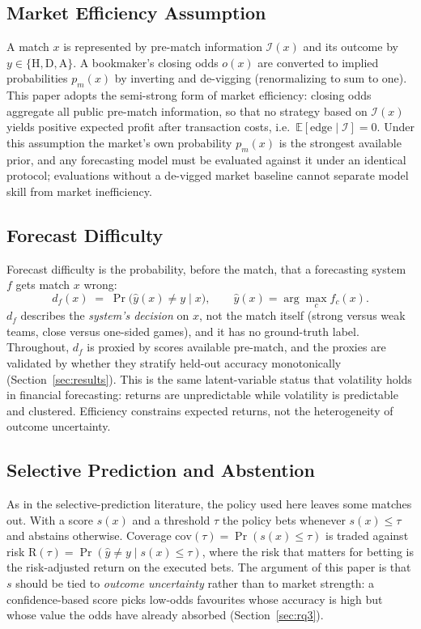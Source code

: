 \documentclass[10pt]{article}
\begin{document}
\subsection{Market Efficiency Assumption}
\label{sec:problem-eff}
A match $x$ is represented by pre-match information $\mathcal{I}(x)$ and its
outcome by $y \in \{\mathrm{H}, \mathrm{D}, \mathrm{A}\}$. A bookmaker's closing
odds $o(x)$ are converted to implied probabilities $p_m(x)$ by inverting and
de-vigging (renormalizing to sum to one). This paper adopts the semi-strong form
of market efficiency: closing odds aggregate all public pre-match information, so
that no strategy based on $\mathcal{I}(x)$ yields positive expected profit after
transaction costs, i.e.\ $\mathbb{E}[\mathrm{edge} \mid \mathcal{I}] = 0$. Under
this assumption the market's own probability $p_m(x)$ is the strongest available
prior, and any forecasting model must be evaluated against it under an identical
protocol; evaluations without a de-vigged market baseline cannot separate model
skill from market inefficiency.

\subsection{Forecast Difficulty}
\label{sec:problem-diff}
Forecast difficulty is the probability, before the match, that a forecasting
system $f$ gets match $x$ wrong:
\begin{equation}
  d_f(x) \;=\; \Pr\bigl( \hat{y}(x) \ne y \mid x \bigr),
  \qquad \hat{y}(x) = \arg\max_c f_c(x).
\label{eq:difficulty}
\end{equation}
$d_f$ describes the \emph{system's decision} on $x$, not the match itself
(strong versus weak teams, close versus one-sided games), and it has no
ground-truth label. Throughout, $d_f$ is
proxied by scores available pre-match, and the proxies are validated by whether
they stratify held-out accuracy monotonically (Section~\ref{sec:results}). This
is the same latent-variable status that volatility holds in financial
forecasting: returns are unpredictable while volatility is predictable and
clustered. Efficiency constrains expected returns, not the heterogeneity of
outcome uncertainty.

\subsection{Selective Prediction and Abstention}
\label{sec:problem-sel}
As in the selective-prediction literature, the policy used here leaves some
matches out. With a score $s(x)$ and a threshold $\tau$ the policy bets whenever
$s(x) \le \tau$ and abstains otherwise. Coverage
$\mathrm{cov}(\tau)=\Pr(s(x)\le\tau)$ is traded against risk
$\mathrm{R}(\tau)=\Pr(\hat{y}\ne y \mid s(x)\le\tau)$, where the risk that matters
for betting is the risk-adjusted return on the executed bets. The argument of
this paper is that $s$ should be tied to \emph{outcome uncertainty} rather than
to market strength: a confidence-based score picks low-odds favourites whose
accuracy is high but whose value the odds have already absorbed
(Section~\ref{sec:rq3}).
\end{document}
